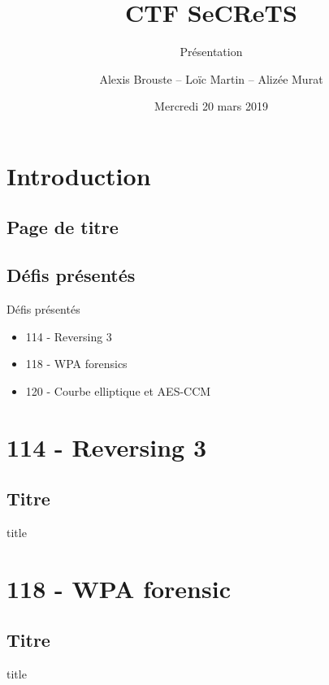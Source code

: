 \documentclass[10pt,sans,usenames,dvipsnames,french,compress]{beamer}
\title{CTF SeCReTS}
\subtitle{Présentation}
\author{Alexis Brouste -- Loïc Martin -- Alizée Murat}
\date{Mercredi 20 mars 2019}
\institute[UVSQ]{UVSQ}
\begin{document}
\section{Introduction}
\subsection{Page de titre}
\begin{frame}[plain]
	\titlepage
\end{frame}

\subsection{Défis présentés}
\begin{frame}{Défis présentés}
	\begin{itemize}
		\item 114 - Reversing 3
		\item 118 - WPA forensics
		\item 120 - Courbe elliptique et AES-CCM
	\end{itemize}
\end{frame}

\section{114 - Reversing 3}
\subsection{Titre}
\begin{frame}
	\begin{beamercolorbox}[sep=8pt,center]{title}
	\end{beamercolorbox}
\end{frame}

\section{118 - WPA forensic}
\subsection{Titre}
\begin{frame}
	\begin{beamercolorbox}[sep=8pt,center]{title}
	\end{beamercolorbox}
\end{frame}
\end{document}
